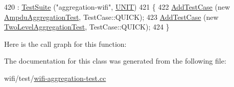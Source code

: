\begin{DoxyCode}
420   : \hyperlink{classns3_1_1TestSuite_a904b0c40583b744d30908aeb94636d1a}{TestSuite} (\textcolor{stringliteral}{"aggregation-wifi"}, \hyperlink{classns3_1_1TestSuite_a1ebfcab34ec8161e085e8e3a1855eae0a3885375a3787abf60431f8454b3cadbd}{UNIT})
421 \{
422   \hyperlink{classns3_1_1TestCase_a3718088e3eefd5d6454569d2e0ddd835}{AddTestCase} (\textcolor{keyword}{new} \hyperlink{classAmpduAggregationTest}{AmpduAggregationTest}, TestCase::QUICK);
423   \hyperlink{classns3_1_1TestCase_a3718088e3eefd5d6454569d2e0ddd835}{AddTestCase} (\textcolor{keyword}{new} \hyperlink{classTwoLevelAggregationTest}{TwoLevelAggregationTest}, TestCase::QUICK);
424 \}
\end{DoxyCode}


Here is the call graph for this function\+:




The documentation for this class was generated from the following file\+:\begin{DoxyCompactItemize}
\item 
wifi/test/\hyperlink{wifi-aggregation-test_8cc}{wifi-\/aggregation-\/test.\+cc}\end{DoxyCompactItemize}
